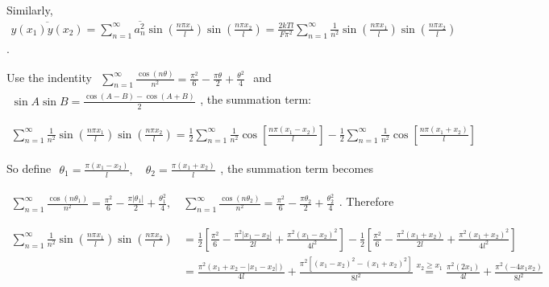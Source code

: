 \documentclass[../../main.tex]{subfiles}
\begin{document}
  Similarly, $\begin{aligned}
    \overline{y(x_{1})y(x_{2})} = \sum_{n=1}^{\infty}\overline{a_{n}^{2}}\sin{\left(\frac{n\pi x_{1}}{l}\right)}\sin{\left(\frac{n\pi x_{2}}{l}\right)} = \frac{2kTl}{F\pi^{2}}\sum_{n=1}^{\infty}\frac{1}{n^{2}}\sin{\left(\frac{n\pi x_{1}}{l}\right)}\sin{\left(\frac{n\pi x_{2}}{l}\right)}
  \end{aligned}$.

  Use the indentity $\begin{aligned}
    \sum_{n=1}^{\infty}\frac{\cos{(n\theta)}}{n^{2}} = \frac{\pi^{2}}{6} - \frac{\pi\theta}{2} + \frac{\theta^{2}}{4}
  \end{aligned}$ and $\begin{aligned}
    \sin{A}\sin{B} = \frac{\cos{(A-B)}-\cos{(A+B)}}{2}
  \end{aligned}$, the summation term:

  $\begin{aligned}
    \sum_{n=1}^{\infty}\frac{1}{n^{2}}\sin{\left(\frac{n\pi x_{1}}{l}\right)}\sin{\left(\frac{n\pi x_{2}}{l}\right)} = \frac{1}{2}\sum_{n=1}^{\infty}\frac{1}{n^{2}}\cos{\left[\frac{n\pi(x_{1}-x_{2})}{l}\right]} - \frac{1}{2}\sum_{n=1}^{\infty}\frac{1}{n^{2}}\cos{\left[\frac{n\pi(x_{1}+x_{2})}{l}\right]}
  \end{aligned}$

  So define $\begin{aligned}
    \theta_{1} = \frac{\pi(x_{1}-x_{2})}{l},\quad\theta_{2} = \frac{\pi(x_{1}+x_{2})}{l}
  \end{aligned}$, the summation term becomes 
  
  $\begin{aligned}
    \sum_{n=1}^{\infty}\frac{\cos{(n\theta_{1})}}{n^{2}} = \frac{\pi^{2}}{6} - \frac{\pi|\theta_{1}|}{2} + \frac{\theta_{1}^{2}}{4},\quad \sum_{n=1}^{\infty}\frac{\cos{(n\theta_{2})}}{n^{2}} = \frac{\pi^{2}}{6} - \frac{\pi\theta_{2}}{2} + \frac{\theta_{2}^{2}}{4}
  \end{aligned}$. Therefore

  $\begin{aligned}
    \sum_{n=1}^{\infty}\frac{1}{n^{2}}\sin{\left(\frac{n\pi x_{1}}{l}\right)}\sin{\left(\frac{n\pi x_{2}}{l}\right)} &= \frac{1}{2}\left[
    \frac{\pi^{{2}}}{6} - \frac{\pi^{2}|x_{1}-x_{2}|}{2l} + \frac{\pi^{2}(x_{1}-x_{2})^{2}}{4l^{2}}
    \right] - \frac{1}{2}\left[
    \frac{\pi^{{2}}}{6} - \frac{\pi^{2}(x_{1}+x_{2})}{2l} + \frac{\pi^{2}(x_{1}+x_{2})^{2}}{4l^{2}}
    \right]\\
  &= \frac{\pi^{2}(x_{1}+x_{2}-|x_{1}-x_{2}|)}{4l} + \frac{\pi^{2}[(x_{1}-x_{2})^{2}-(x_{1}+x_{2})^{2}]}{8l^{2}} \stackrel{x_{2}\geq x_{1}}{=} \frac{\pi^{2} (2x_{1})}{4l} + \frac{\pi^{2}(-4x_{1}x_{2})}{8l^{2}}
  \end{aligned}$
\end{document}
